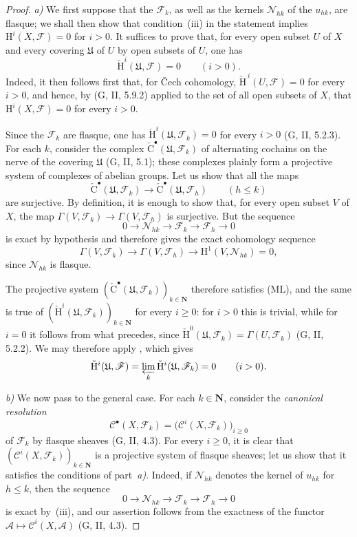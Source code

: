\documentclass[oneside]{amsart}
\theoremstyle{ega-env-style}
\theoremstyle{ega-thm-env-style}
\theoremstyle{ega-defn-env-style}
\def\mathcal{\mathscr}
\def\sh{\mathcal}                   %
\def\bb{\mathbf}                    %
\def\leq{\leqslant}                 %
\def\geq{\geqslant}                 %
\def\HH{\mathrm{H}}                 %
\def\CHH{\check{\HH}}               %
\newcommand{\oldpage}[2][]{{\marginnote{\normalfont{\textbf{#1}~|~#2}}}\ignorespaces}
\begin{document}
\begin{proof}
\emph{a)}
We first suppose that the $\sh{F}_k$, as well as the kernels
$\sh{N}_{hk}$ of the $u_{hk}$, are flasque; we shall then show that
condition~{\rm(iii)} in the statement implies
$\HH^i(X,\sh{F})=0$ for $i>0$.
It suffices to prove that, for every open subset $U$ of $X$ and every
covering $\mathfrak{U}$ of $U$ by open subsets of $U$, one has
\[
  \CHH^i(\mathfrak{U},\sh{F})=0
  \qquad (i>0).
\]
Indeed, it then follows first that, for \v{C}ech cohomology,
$\check{\HH}^{\,i}(U,\sh{F})=0$ for every $i>0$, and hence, by
(G, II, 5.9.2) applied to the set of all open subsets of $X$, that
$\HH^i(X,\sh{F})=0$ for every $i>0$.

Since the $\sh{F}_k$ are flasque, one has
$\CHH^i(\mathfrak{U},\sh{F}_k)=0$ for every $i>0$
(G, II, 5.2.3).
For each $k$, consider the complex
$\check{\mathrm{C}}^\bullet(\mathfrak{U},\sh{F}_k)$ of alternating
cochains on the nerve of the covering $\mathfrak{U}$ (G, II, 5.1);
these complexes plainly form a projective system of complexes of
abelian groups.
Let us show that all the maps
\[
  \check{\mathrm{C}}^\bullet(\mathfrak{U},\sh{F}_k)
  \longrightarrow
  \check{\mathrm{C}}^\bullet(\mathfrak{U},\sh{F}_h)
  \qquad(h\leq k)
\]
are surjective.
By definition, it is enough to show that, for every open subset $V$
of $X$, the map
$\Gamma(V,\sh{F}_k)\longrightarrow\Gamma(V,\sh{F}_h)$ is
surjective. But the sequence
\[
  0\longrightarrow\sh{N}_{hk}\longrightarrow\sh{F}_k
  \longrightarrow\sh{F}_h\longrightarrow0
\]
is exact by hypothesis and therefore gives the exact cohomology
sequence
\[
  \Gamma(V,\sh{F}_k)\longrightarrow\Gamma(V,\sh{F}_h)
  \longrightarrow\HH^1(V,\sh{N}_{hk})=0,
\]
since $\sh{N}_{hk}$ is flasque.

The projective system
$(\check{\mathrm{C}}^\bullet(\mathfrak{U},\sh{F}_k))_{k\in\bb{N}}$
therefore satisfies (ML), and the same is true of
$(\CHH^i(\mathfrak{U},\sh{F}_k))_{k\in\bb{N}}$ for every $i\geq0$:
for $i>0$ this is trivial, while for $i=0$ it follows from what
precedes, since
$\CHH^0(\mathfrak{U},\sh{F}_k)=\Gamma(U,\sh{F}_k)$
(G, II, 5.2.2).
We may therefore apply , which gives
\[
  \CHH^i(\mathfrak{U},\sh{F})
  =
  \varprojlim_k\CHH^i(\mathfrak{U},\sh{F}_k)
  =0
  \qquad(i>0).
\]

\emph{b)}
We now pass to the general case. For each $k\in\bb{N}$, consider the
\emph{canonical resolution}
\[
  \sh{C}^\bullet(X,\sh{F}_k)
  =
  \bigl(\sh{C}^i(X,\sh{F}_k)\bigr)_{i\geq0}
\]
of $\sh{F}_k$ by flasque sheaves (G, II, 4.3).
For every $i\geq0$, it is clear that
$(\sh{C}^i(X,\sh{F}_k))_{k\in\bb{N}}$ is a projective system of
flasque sheaves; let us show that it satisfies the conditions of
part~\emph{a)}.
\oldpage[0\textsubscript{III}]{69}
Indeed, if $\sh{N}_{hk}$ denotes the kernel of $u_{hk}$ for $h\leq k$,
then the sequence
\[
  0\longrightarrow\sh{N}_{hk}\longrightarrow\sh{F}_k
  \longrightarrow\sh{F}_h\longrightarrow0
\]
is exact by~{\rm(iii)}, and our assertion follows from the exactness
of the functor
$\sh{A}\longmapsto\sh{C}^i(X,\sh{A})$ (G, II, 4.3).


\end{proof}
\end{document}
